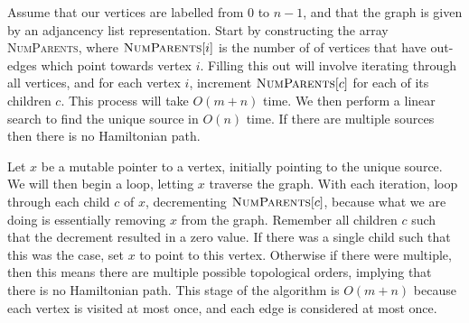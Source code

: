 \documentclass{article}
\begin{document}
\begin{solution}
\begin{enumerate}[label = (\alph*)]
    Assume that our vertices are labelled from $0$ to $n-1$, and that the graph is given by an adjancency list representation.
    Start by constructing the array \textsc{NumParents}, where $\textsc{NumParents}[i]$ is the number of of vertices that have out-edges 
    which point towards vertex $i$. Filling this out will involve iterating through all vertices, and for each vertex $i$, increment $\textsc{NumParents}[c]$ for each of its children $c$.
    This process will take $O(m +n)$ time. We then perform a linear search to find the unique source in $O(n)$ time. 
    If there are multiple sources then there is no Hamiltonian path.

    Let $x$ be a mutable pointer to a vertex, initially pointing to the unique source. 
    We will then begin a loop, letting $x$ traverse the graph. With each iteration, 
    loop through each child $c$ of $x$, decrementing $\textsc{NumParents}[c]$, because what we are doing is essentially removing $x$ from the graph.
    Remember all children $c$ such that the decrement resulted in a zero value. If there was a single child such that this was the case, set $x$ to point to this vertex. 
    Otherwise if there were multiple, then this means there are multiple possible topological orders, implying that there is no Hamiltonian path.
    This stage of the algorithm is $O(m +n)$ because each vertex is visited at most once, and each edge is considered at most once.

\end{enumerate}
\end{solution}
\end{document}
